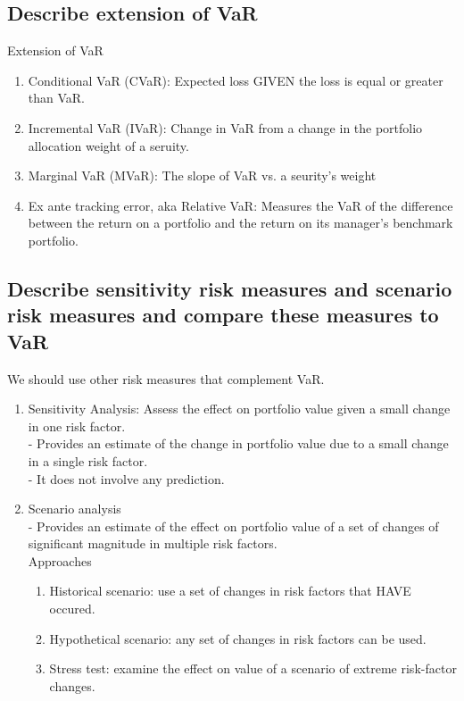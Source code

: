 \documentclass{article}
\newcommand{\be}{\begin{enumerate}}
\newcommand{\ee}{\end{enumerate}}
\begin{document}
\subsection{Describe extension of VaR}
Extension of VaR
\be
    \item Conditional VaR (CVaR): Expected loss GIVEN the loss is equal or greater than VaR.
    \item Incremental VaR (IVaR): Change in VaR from a change in the portfolio allocation weight of a seruity.
    \item Marginal VaR (MVaR): The slope of VaR vs. a seurity's weight
    \item Ex ante tracking error, aka Relative VaR: Measures the VaR of the difference between the return on a
    portfolio and the return on its manager's benchmark portfolio.
\ee
\subsection{Describe sensitivity risk measures and scenario risk measures and compare
these measures to VaR}
We should use other risk measures that complement VaR.  
\be
    \item Sensitivity Analysis: Assess the effect on portfolio value given a small change in one risk factor.
        \\ - Provides an estimate of the change in portfolio value due to a small change in a single risk factor.
        \\ - It does not involve any prediction.    
    \item Scenario analysis
        \\ - Provides an estimate of the effect on portfolio value of a set of changes of
        significant magnitude in multiple risk factors.
        \\ Approaches
        \be
        \item  Historical scenario: use a set of changes in risk factors that HAVE occured.
        \item Hypothetical scenario: any set of changes in risk factors can be used.
        \item Stress test: examine the effect on value of a scenario of extreme risk-factor changes.
        \ee
\ee
\end{document}
